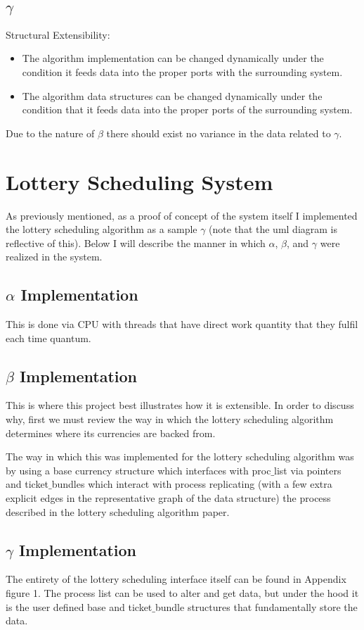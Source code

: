 \documentclass[acmsmall]{acmart}
\begin{document}
\begin{multicols}{2}
  \subsection{$\gamma$}
    Structural Extensibility:
    \begin{itemize}
      \item The algorithm implementation can be changed dynamically under the
        condition it feeds data into the proper ports with the surrounding
        system.
      \item The algorithm data structures can be changed dynamically under the
        condition that it feeds data into the proper ports of the surrounding
        system.
    \end{itemize}
    Due to the nature of $\beta$ there should exist no variance in the data
    related to $\gamma$.

\section{Lottery Scheduling System}
  As previously mentioned, as a proof of concept of the system itself I
  implemented the lottery scheduling algorithm as a sample $\gamma$ (note that
  the uml diagram is reflective of this). Below I will describe the manner in
  which $\alpha$, $\beta$, and $\gamma$ were realized in the system.
  \subsection{$\alpha$ Implementation}
    This is done via CPU with threads that have direct work quantity that they
    fulfil each time quantum.
  \subsection{$\beta$ Implementation}
    This is where this project best illustrates how it is extensible. In order
    to discuss why, first we must review the way in which the lottery scheduling
    algorithm determines where its currencies are backed from.
    \par
    The way in which this was implemented for the lottery scheduling algorithm
    was by using a base currency structure which interfaces with proc$\_$list
    via pointers and ticket$\_$bundles which interact with process replicating
    (with a few extra explicit edges in the representative graph of the data
    structure) the process described in the lottery scheduling algorithm paper.
  \subsection{$\gamma$ Implementation}
    The entirety of the lottery scheduling interface itself can be found in
    Appendix figure 1. The process list can be used to alter and get data, but
    under the hood it is the user defined base and ticket$\_$bundle structures
    that fundamentally store the data.


\end{multicols}
\end{document}
